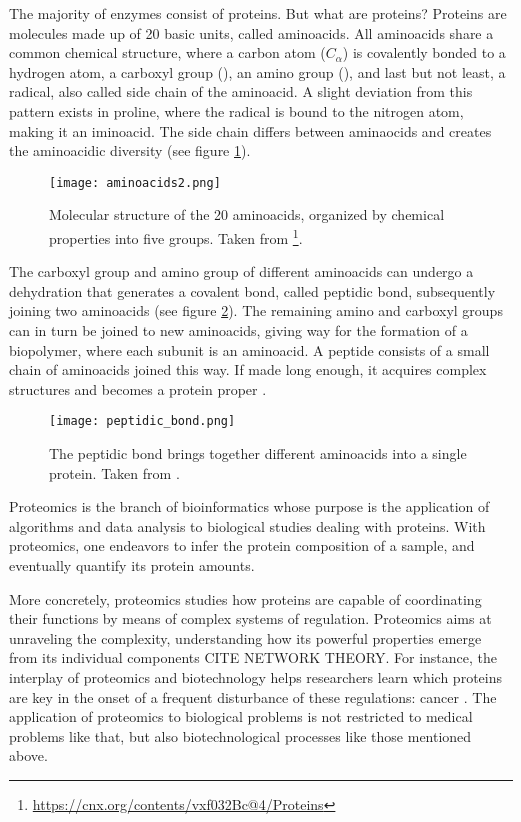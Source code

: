 The majority of enzymes consist of proteins. But what are proteins? Proteins are molecules made up of 20 basic units, called aminoacids. All aminoacids share a common chemical structure, where a carbon atom ($C_\alpha$) is covalently bonded to a hydrogen atom, a carboxyl group (), an amino group (), and last but not least, a radical, also called side chain of the aminoacid. A slight deviation from this pattern exists in proline, where the radical is bound to the nitrogen atom, making it an iminoacid. The side chain differs between aminaocids and creates the aminoacidic diversity   (see figure \ref{fig:aminoacids}).

\begin{figure}
  \centering
  \texttt{[image: aminoacids2.png]}
  \caption[The 20 aminoacids]{Molecular structure of the 20 aminoacids, organized by chemical properties into five groups. Taken from \footnote{\href{https://cnx.org/contents/vxf032Bc@4/Proteins}{https://cnx.org/contents/vxf032Bc@4/Proteins}}.}
  \label{fig:aminoacids}
\end{figure}

The carboxyl group and amino group of different aminoacids can undergo a dehydration that generates a covalent bond, called peptidic bond, subsequently joining two aminoacids (see figure \ref{fig:peptidic_bond}). The remaining amino and carboxyl groups can in turn be joined to new aminoacids, giving way for the formation of a biopolymer, where each subunit is an aminoacid. A peptide consists of a small chain of aminoacids joined this way. If made long enough, it acquires complex structures and becomes a protein proper \cite{Nelson2008}.

\begin{figure}
  \centering
  \texttt{[image: peptidic\_bond.png]}
  \caption[The peptidic bond]{The peptidic bond brings together different aminoacids into a single protein. Taken from \cite{Nelson2008}.}
  \label{fig:peptidic_bond}
\end{figure}


Proteomics is the branch of bioinformatics whose purpose is the application of algorithms and data analysis to biological studies dealing with proteins. With proteomics, one endeavors to infer the protein composition of a sample, and eventually quantify its protein amounts. 

More concretely, proteomics studies how proteins are capable of coordinating their functions by means of complex systems of regulation.  Proteomics aims at unraveling the complexity, understanding how its powerful properties emerge from its individual components CITE NETWORK THEORY. For instance, the interplay of proteomics and biotechnology helps researchers learn which proteins are key in the onset of a frequent disturbance of these regulations: cancer \cite{Saraon2012}. The application of proteomics to biological problems is not restricted to medical problems like that, but also biotechnological processes like those mentioned above.





